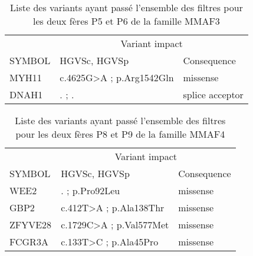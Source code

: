 \documentclass[12pt,twoside]{ugathesis}
\begin{document}
\begin{longtable}[t]{lll}
\caption{\label{tab:tabmmaf3}Liste des variants ayant passé l'ensemble des filtres pour les deux fères P5 et P6 de la famille MMAF3}\\
\toprule
\multicolumn{1}{c}{ } & \multicolumn{2}{c}{Variant impact} \\
\cmidrule(l{2pt}r{2pt}){2-3}
SYMBOL & HGVSc, HGVSp & Consequence\\
\midrule
MYH11 & c.4625G>A ; p.Arg1542Gln & missense\\
DNAH1 & . ; . & splice acceptor\\
\bottomrule
\end{longtable}

\begin{longtable}[t]{lll}
\caption{\label{tab:tabmmaf4}Liste des variants ayant passé l'ensemble des filtres pour les deux fères P8 et P9 de la famille MMAF4}\\
\toprule
\multicolumn{1}{c}{ } & \multicolumn{2}{c}{Variant impact} \\
\cmidrule(l{2pt}r{2pt}){2-3}
SYMBOL & HGVSc, HGVSp & Consequence\\
\midrule
WEE2 & . ; p.Pro92Leu & missense\\
GBP2 & c.412T>A ; p.Ala138Thr & missense\\
ZFYVE28 & c.1729C>A ; p.Val577Met & missense\\
FCGR3A & c.133T>C ; p.Ala45Pro & missense\\
\bottomrule
\end{longtable}

\newpage
\end{document}
